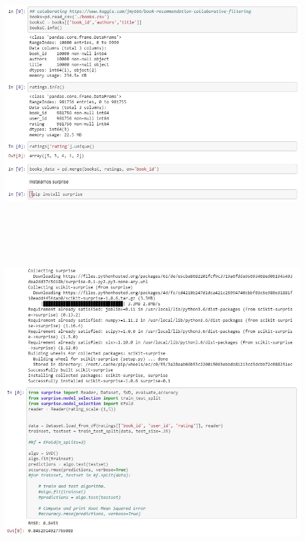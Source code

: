 \begin{center}
\includegraphics[width=14cm, height=12cm]{./Imagenes/traba14.jpg}
\end{center}


\begin{center}
\includegraphics[width=18cm, height=14cm]{./Imagenes/traba15.jpg}
\end{center}


